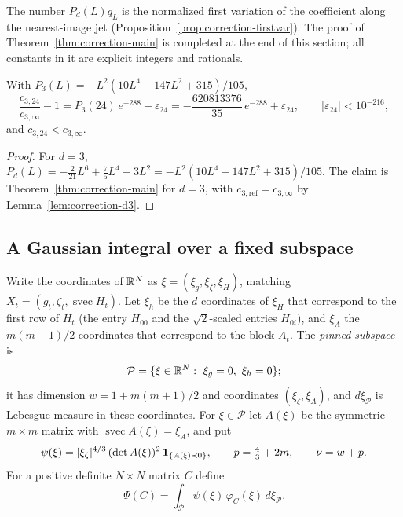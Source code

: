 The number $P_d(L)q_L$ is the normalized first variation of the coefficient along the nearest-image jet (Proposition~\ref{prop:correction-firstvar}). The proof of Theorem~\ref{thm:correction-main} is completed at the end of this section; all constants in it are explicit integers and rationals.

\begin{corollary}\label{cor:correction-main}
With $P_3(L)=-L^2(10L^4-147L^2+315)/105$,
\begin{equation}\label{eq:correction-main3}
\frac{c_{3,24}}{c_{3,\infty}}-1=P_3(24)\,e^{-288}+\varepsilon_{24}=-\frac{620813376}{35}\,e^{-288}+\varepsilon_{24},\qquad|\varepsilon_{24}|<10^{-216},
\end{equation}
and $c_{3,24}<c_{3,\infty}$.
\end{corollary}

\begin{proof}
For $d=3$, $P_d(L)=-\frac{2}{21}L^6+\frac75L^4-3L^2=-L^2(10L^4-147L^2+315)/105$. The claim is Theorem~\ref{thm:correction-main} for $d=3$, with $c_{3,\mathrm{ref}}=c_{3,\infty}$ by Lemma~\ref{lem:correction-d3}.
\end{proof}

\subsection{A Gaussian integral over a fixed subspace}

\begin{definition}\label{def:correction-subspace}
Write the coordinates of $\mathbb R^N$ as $\xi=(\xi_g,\xi_\zeta,\xi_H)$, matching $X_t=(g_t,\zeta_t,\operatorname{svec}H_t)$. Let $\xi_h$ be the $d$ coordinates of $\xi_H$ that correspond to the first row of $H_t$ (the entry $H_{00}$ and the $\sqrt2$-scaled entries $H_{0i}$), and $\xi_A$ the $m(m+1)/2$ coordinates that correspond to the block $A_t$. The \emph{pinned subspace} is
\[
\mathcal P=\{\xi\in\mathbb R^N:\ \xi_g=0,\ \xi_h=0\};
\]
it has dimension $w=1+m(m+1)/2$ and coordinates $(\xi_\zeta,\xi_A)$, and $d\xi_{\mathcal P}$ is Lebesgue measure in these coordinates. For $\xi\in\mathcal P$ let $A(\xi)$ be the symmetric $m\times m$ matrix with $\operatorname{svec}A(\xi)=\xi_A$, and put
\begin{equation}\label{eq:correction-weight}
\psi(\xi)=|\xi_\zeta|^{4/3}\,(\det A(\xi))^2\,\mathbf 1_{\{A(\xi)\prec0\}},\qquad p=\tfrac43+2m,\qquad \nu=w+p .
\end{equation}
For a positive definite $N\times N$ matrix $C$ define
\begin{equation}\label{eq:correction-Psi}
\Psi(C)=\int_{\mathcal P}\psi(\xi)\,\varphi_C(\xi)\,d\xi_{\mathcal P}.
\end{equation}
\end{definition}

